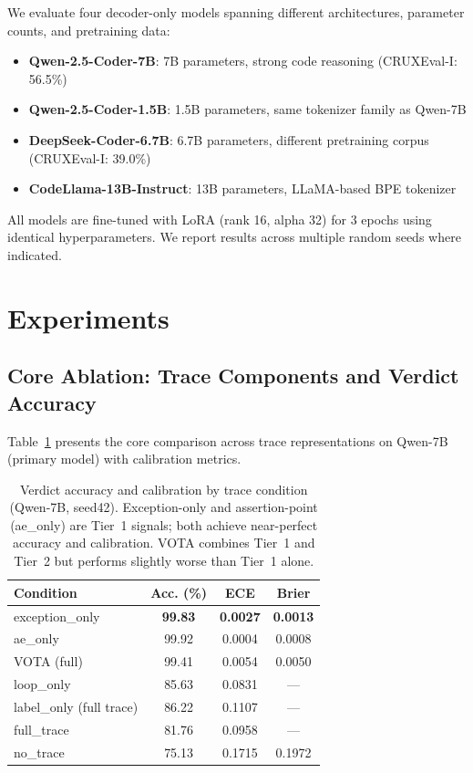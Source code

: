 \documentclass[11pt,a4paper]{article}
\begin{document}
We evaluate four decoder-only models spanning different architectures, parameter counts, and pretraining data:

\begin{itemize}
\item \textbf{Qwen-2.5-Coder-7B}: 7B parameters, strong code reasoning (CRUXEval-I: 56.5\%)
\item \textbf{Qwen-2.5-Coder-1.5B}: 1.5B parameters, same tokenizer family as Qwen-7B
\item \textbf{DeepSeek-Coder-6.7B}: 6.7B parameters, different pretraining corpus (CRUXEval-I: 39.0\%)
\item \textbf{CodeLlama-13B-Instruct}: 13B parameters, LLaMA-based BPE tokenizer
\end{itemize}

All models are fine-tuned with LoRA (rank 16, alpha 32) for 3 epochs using identical hyperparameters. We report results across multiple random seeds where indicated.

\section{Experiments}

\subsection{Core Ablation: Trace Components and Verdict Accuracy}

Table~\ref{tab:core_ablation} presents the core comparison across trace representations on Qwen-7B (primary model) with calibration metrics.

\begin{table}[t]
\centering
\small
\begin{tabular}{lccc}
\toprule
\textbf{Condition} & \textbf{Acc. (\%)} & \textbf{ECE} & \textbf{Brier} \\
\midrule
exception\_only & \textbf{99.83} & \textbf{0.0027} & \textbf{0.0013} \\
ae\_only & 99.92 & 0.0004 & 0.0008 \\
VOTA (full) & 99.41 & 0.0054 & 0.0050 \\
loop\_only & 85.63 & 0.0831 & --- \\
label\_only (full trace) & 86.22 & 0.1107 & --- \\
full\_trace & 81.76 & 0.0958 & --- \\
no\_trace & 75.13 & 0.1715 & 0.1972 \\
\bottomrule
\end{tabular}
\caption{Verdict accuracy and calibration by trace condition (Qwen-7B, seed42). Exception-only and assertion-point (ae\_only) are Tier~1 signals; both achieve near-perfect accuracy and calibration. VOTA combines Tier~1 and Tier~2 but performs slightly worse than Tier~1 alone.}
\label{tab:core_ablation}
\end{table}
\end{document}

